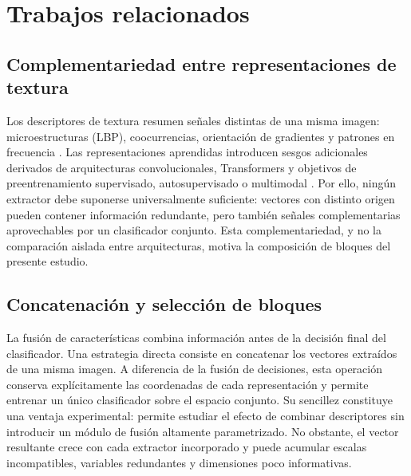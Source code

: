 \documentclass[a4paper,fleqn]{cas-sc}
\begin{document}
\section{Trabajos relacionados}\label{sec:trabajos}

\subsection{Complementariedad entre representaciones de textura}

Los descriptores de textura resumen señales distintas de una misma imagen: microestructuras (LBP), coocurrencias, orientación de gradientes y patrones en frecuencia \citep{haralick1979glcm,ojala2002lbp,dalal2005hog,mehta2016drlbp}. Las representaciones aprendidas introducen sesgos adicionales derivados de arquitecturas convolucionales, Transformers y objetivos de preentrenamiento supervisado, autosupervisado o multimodal \citep{he2016resnet,tan2019efficientnet,dosovitskiy2021vit,liu2021swin,caron2021dino,oquab2024dinov2,he2022mae,radford2021clip,zhai2023siglip}. Por ello, ningún extractor debe suponerse universalmente suficiente: vectores con distinto origen pueden contener información redundante, pero también señales complementarias aprovechables por un clasificador conjunto. Esta complementariedad, y no la comparación aislada entre arquitecturas, motiva la composición de bloques del presente estudio.

\subsection{Concatenación y selección de bloques}

La fusión de características combina información antes de la decisión final del clasificador. Una estrategia directa consiste en concatenar los vectores extraídos de una misma imagen. A diferencia de la fusión de decisiones, esta operación conserva explícitamente las coordenadas de cada representación y permite entrenar un único clasificador sobre el espacio conjunto. Su sencillez constituye una ventaja experimental: permite estudiar el efecto de combinar descriptores sin introducir un módulo de fusión altamente parametrizado. No obstante, el vector resultante crece con cada extractor incorporado y puede acumular escalas incompatibles, variables redundantes y dimensiones poco informativas.
\end{document}
